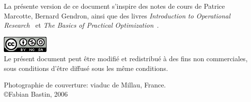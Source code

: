 \documentclass[11pt]{book}%
\theoremstyle{plain}
\numberwithin{equation}{section}
\begin{document}

\noindent
\small
La présente version de ce document s'inspire des notes de cours de Patrice Marcotte, Bernard Gendron, ainsi que des livres {\sl Introduction to Operational Research}~\cite{HillLieb01} et {\sl The Basics of Practical Optimization}~\cite{Levy09}.


\noindent
\includegraphics{cc.png}\\
Le présent document peut être modifié et redistribué à des fins non commerciales, sous conditions d'être diffusé sous les même conditions.


{
\noindent
\footnotesize{Photographie de couverture: viaduc de Millau, France.\\
\copyright Fabian Bastin, 2006}
}

\tableofcontents

\mainmatter

















\backmatter



{}
\makeatletter


\makeatother

\end{document}
